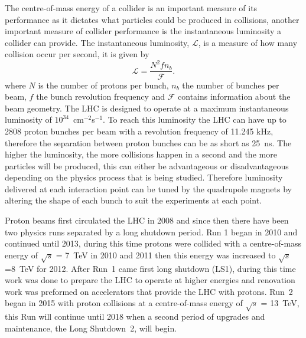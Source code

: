 The centre-of-mass energy of a collider is an important measure of its performance as it dictates what particles could be produced in collisions, another important measure of collider performance is the instantaneous luminosity a collider can provide. The instantaneous luminosity, $\mathcal{L}$, is a measure of how many collision occur per second, it is given by
\begin{equation}
\mathcal{L} = \frac{N^{2} f n_{b}}{\mathcal{F}}.
\label{eq:inst_lumi}
\end{equation}
where $N$ is the number of protons per bunch, $n_{b}$ the number of bunches per beam, $f$ the bunch revolution frequency and $\mathcal{F}$ contains information about the beam geometry. The LHC is designed to operate at a maximum instantaneous luminosity of $10^{34}$~cm$^{-2}$s$^{-1}$. To reach this luminosity the LHC can have up to 2808 proton bunches per beam with a revolution frequency of 11.245 kHz, therefore the separation between proton bunches can be as short as 25~ns. The higher the luminosity, the more collisions happen in a second and the more particles will be produced, this can either be advantageous or disadvantageous depending on the physics process that is being studied.
Therefore luminosity delivered at each interaction point can be tuned by the quadrupole magnets by altering the shape of each bunch to suit the experiments at each point.

Proton beams first circulated the LHC in 2008 and since then there have been two physics runs separated by a long shutdown period. Run 1 began in 2010 and continued until 2013, during this time protons were collided with a centre-of-mass energy of $\sqrt{s}$ = 7~TeV in 2010 and 2011 then this energy was increased to $\sqrt{s}$ =8~TeV for 2012. After Run~1 came first long shutdown (LS1), during this time work was done to prepare the LHC to operate at higher energies and renovation work was preformed on accelerators that provide the LHC with protons. Run~2 began in 2015 with proton collisions at a centre-of-mass energy of $\sqrt{s}$ =  13~TeV, %
this Run will continue until 2018 when a second period of upgrades and maintenance, the Long Shutdown~2, will begin.




